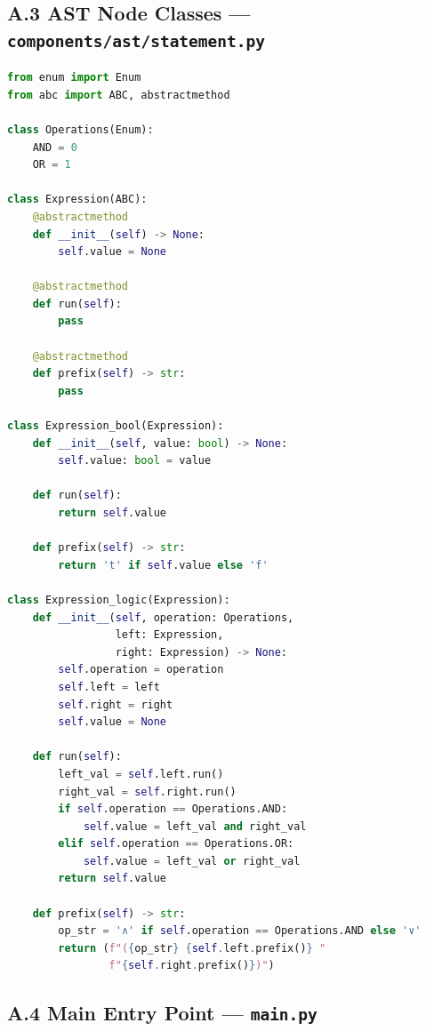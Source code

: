 \subsection*{A.3 AST Node Classes --- \texttt{components/ast/statement.py}}

\begin{lstlisting}[language=Python]
from enum import Enum
from abc import ABC, abstractmethod

class Operations(Enum):
    AND = 0
    OR = 1

class Expression(ABC):
    @abstractmethod
    def __init__(self) -> None:
        self.value = None

    @abstractmethod
    def run(self):
        pass

    @abstractmethod
    def prefix(self) -> str:
        pass

class Expression_bool(Expression):
    def __init__(self, value: bool) -> None:
        self.value: bool = value

    def run(self):
        return self.value

    def prefix(self) -> str:
        return 't' if self.value else 'f'

class Expression_logic(Expression):
    def __init__(self, operation: Operations,
                 left: Expression,
                 right: Expression) -> None:
        self.operation = operation
        self.left = left
        self.right = right
        self.value = None

    def run(self):
        left_val = self.left.run()
        right_val = self.right.run()
        if self.operation == Operations.AND:
            self.value = left_val and right_val
        elif self.operation == Operations.OR:
            self.value = left_val or right_val
        return self.value

    def prefix(self) -> str:
        op_str = '∧' if self.operation == Operations.AND else '∨'
        return (f"({op_str} {self.left.prefix()} "
                f"{self.right.prefix()})")
\end{lstlisting}

\subsection*{A.4 Main Entry Point --- \texttt{main.py}}

